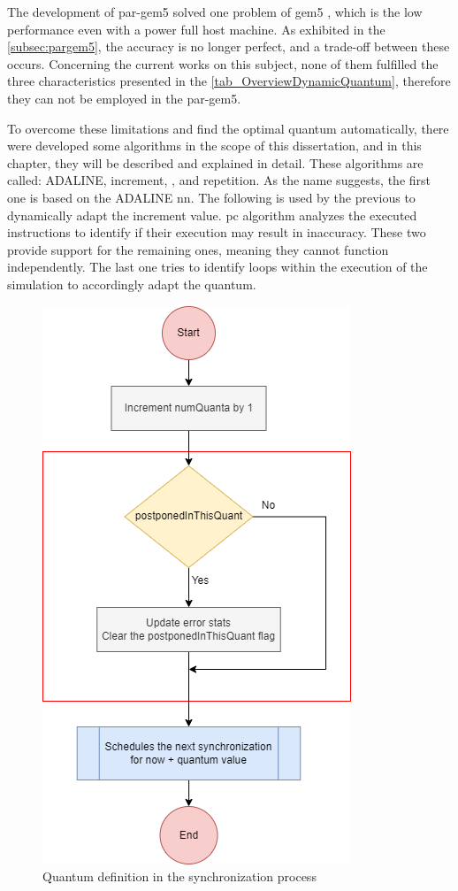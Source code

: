 
% 

The development of par-gem5 \cite{pargem5} solved one problem of gem5 \cite{TheGem5Simulator}, which is the low performance even with a power full host machine. As exhibited in the \autoref{subsec:pargem5}, the accuracy is no longer perfect, and a trade-off between these occurs. Concerning the current works on this subject, none of them fulfilled the three characteristics presented in the \autoref{tab_OverviewDynamicQuantum}, therefore they can not be employed in the par-gem5. 

To overcome these limitations and find the optimal quantum automatically, there were developed some algorithms in the scope of this dissertation, and in this chapter, they will be described and explained in detail. These algorithms are called: ADALINE, increment, , and repetition. As the name suggests, the first one is based on the ADALINE \gls{nn}. The following is used by the previous to dynamically adapt the increment value. \gls{pc} algorithm analyzes the executed instructions to identify if their execution may result in inaccuracy. These two provide support for the remaining ones, meaning they cannot function independently. The last one tries to identify loops within the execution of the simulation to accordingly adapt the quantum.  

\begin{figure}[H]
	\centering
 	\includegraphics[width=0.5\linewidth]{Images/GlobalSyncEventStatic.png}
 	\caption{Quantum definition in the synchronization process}
	 \label{fig_GlobalSyncEventStatic}
\end{figure}

